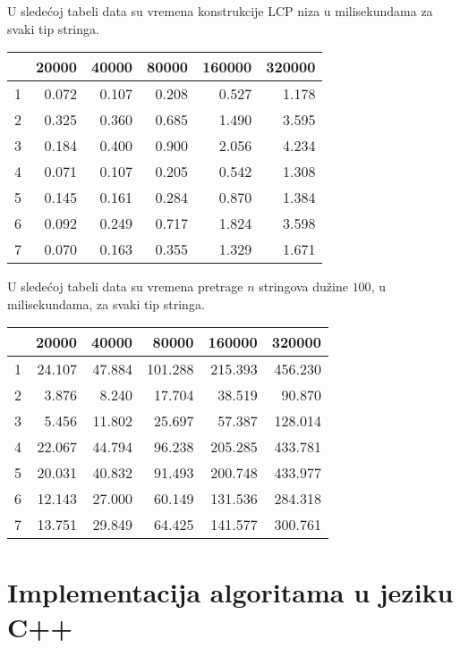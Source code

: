 U slede\' coj tabeli data su vremena konstrukcije LCP niza u milisekundama za svaki tip stringa.

\begin{tabular}{r|r|r|r|r|r}
                & 20000 & 40000 & 80000 & 160000 & 320000 \\
\hline
1 & 0.072 & 0.107 & 0.208 & 0.527 & 1.178  \\
\hline
2 & 0.325 & 0.360 & 0.685 & 1.490 & 3.595  \\
\hline
3 & 0.184 & 0.400 & 0.900 & 2.056 & 4.234  \\
\hline
4 & 0.071 & 0.107 & 0.205 & 0.542 & 1.308  \\
\hline
5 & 0.145 & 0.161 & 0.284 & 0.870 & 1.384  \\
\hline
6 & 0.092 & 0.249 & 0.717 & 1.824 & 3.598  \\
\hline
7 & 0.070 & 0.163 & 0.355 & 1.329 & 1.671  \\

\end{tabular}

U slede\' coj tabeli data su vremena pretrage $n$ stringova du\v zine $100$, u milisekundama, za svaki tip stringa.

\begin{tabular}{r|r|r|r|r|r}
                & 20000 & 40000 & 80000 & 160000 & 320000 \\
\hline
1 & 24.107 & 47.884 & 101.288 & 215.393 & 456.230  \\
\hline
2 & 3.876 & 8.240 & 17.704 & 38.519 & 90.870  \\
\hline
3 & 5.456 & 11.802 & 25.697 & 57.387 & 128.014  \\
\hline
4 & 22.067 & 44.794 & 96.238 & 205.285 & 433.781  \\
\hline
5 & 20.031 & 40.832 & 91.493 & 200.748 & 433.977  \\
\hline
6 & 12.143 & 27.000 & 60.149 & 131.536 & 284.318  \\
\hline
7 & 13.751 & 29.849 & 64.425 & 141.577 & 300.761  \\
\end{tabular}

\section{Implementacija algoritama u jeziku C++}
\label{sirkod}
